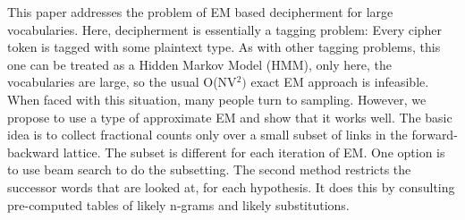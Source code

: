 This paper addresses the problem of EM based decipherment for large vocabularies. Here, decipherment is essentially a tagging problem: Every cipher token is tagged with some plaintext type. As with other tagging problems, this one can be treated as a Hidden Markov Model (HMM), only here, the vocabularies are large, so the usual O(NV$^2)$ exact EM approach is infeasible. When faced with this situation, many people turn to sampling. However, we propose to use a type of approximate EM and show that it works well. The basic idea is to collect fractional counts only over a small subset of links in the forward-backward lattice. The subset is different for each iteration of EM. One option is to use beam search to do the subsetting. The second method restricts the successor words that are looked at, for each hypothesis. It does this by consulting pre-computed tables of likely n-grams and likely substitutions.
